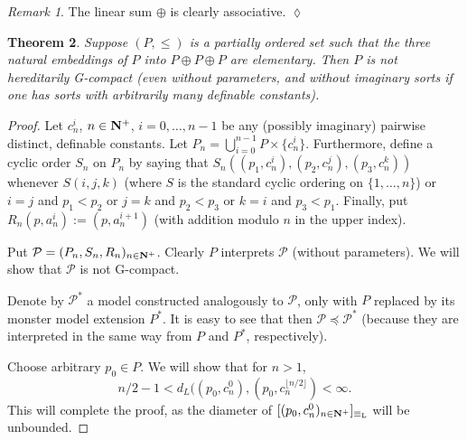 \documentclass[final,a4paper,12pt]{amsart}
\newcommand\Lasc{{\mathrm{L}}}
\DeclareMathOperator{\Th}{{Th}}
\newtheorem{thm}{Theorem}[section]
\theoremstyle{remark}
\newtheorem{rem}[thm]{Remark}
\theoremstyle{definition}
\newcounter{claimcounter}[thm]
\newenvironment{clm}{\stepcounter{claimcounter}{\noindent {\textbf{Claim}} \theclaimcounter:}}{}
\newenvironment{clmproof}[1][\proofname]{\proof[#1]\renewcommand{\qedsymbol}{$\square$(claim)}}{\endproof}
\newcommand{\xqed}[1]{%
	\leavevmode\unskip\penalty9999 \hbox{}\nobreak\hfill
	\quad\hbox{\ensuremath{#1}}}
\begin{document}
	\begin{rem}
		The linear sum $\oplus$ is clearly associative.\xqed{\lozenge}
	\end{rem}
	
	\begin{thm}
		\label{thm:main_3copies}
		Suppose $(P,\leq)$ is a partially ordered set such that the three natural embeddings of $P$ into $P\oplus P\oplus P$ are elementary. Then $P$ is not hereditarily G-compact (even without parameters, and without imaginary sorts if one has sorts with arbitrarily many definable constants).
	\end{thm}
	\begin{proof}
		Let $c_n^i$, $n\in {\bf N}^+$, $i=0,\ldots,n-1$ be any (possibly imaginary) pairwise distinct, definable constants. Let $P_n=\bigcup_{i=0}^{n-1} P\times \{c_n^i\}$. Furthermore, define a cyclic order $S_n$ on $P_n$ by saying that $S_n((p_1,c_n^i),(p_2,c_n^j),(p_3,c_n^k))$ whenever $S(i,j,k)$ (where $S$ is the standard cyclic ordering on $\{1,\ldots,n\}$) or $i=j$ and $p_1<p_2$ or $j=k$ and $p_2<p_3$ or $k=i$ and $p_3<p_1$. Finally, put $R_n(p,a_n^i):=(p,a_n^{i+1})$ (with addition modulo $n$ in the upper index).
		
		Put $\mathcal P=(P_n,S_n,R_n)_{n\in {\bf N}^+}$. Clearly $P$ interprets $\mathcal P$ (without parameters). We will show that $\mathcal P$ is not G-compact.
		
		Denote by $\mathcal P^*$ a model constructed analogously to $\mathcal P$, only with $P$ replaced by its monster model extension $P^*$. It is easy to see that then $\mathcal P\preceq \mathcal P^*$ (because they are interpreted in the same way from $P$ and $P^*$, respectively).
%		
		
		Choose arbitrary $p_0\in P$. We will show that for $n>1$,
		\[
			n/2-1<d_L((p_0,c_n^0),(p_0,c_n^{\lfloor n/2\rfloor})<\infty.
		\]
		This will complete the proof, as the diameter of $[(p_0,c_n^0)_{n\in {\bf N}^+}]_{\equiv_{\Lasc}}$ will be unbounded.
		

\end{proof}
\end{document}
